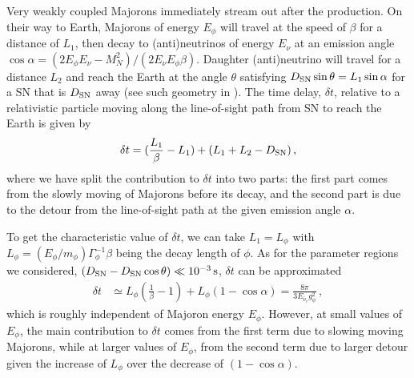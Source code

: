 Very weakly coupled Majorons immediately stream out after the production. On their way to Earth, Majorons of energy $E_\phi$ will travel at the speed of $\beta$ for a distance of $L_1$, then decay to (anti)neutrinos of energy $E_\nu$ at an emission angle $\cos\alpha = (2 E_\phi E_{\nu} - M^2_N)/(2E_{\nu}E_\phi\beta)$. Daughter (anti)neutrino will travel for a distance $L_2$ and reach the Earth at the angle $\theta$ satisfying $D_{\rm SN} \sin\theta = L_1 \sin\alpha$ for a SN that is $D_{\rm SN}$ away (see such geometry in \cite{Brdar:2023tmi}). The time delay, $\delta t$, relative to a relativistic particle moving along the line-of-sight path from SN to reach the Earth is given by
\cite{Jaeckel:2017tud}
\begin{align}
    \delta t = (\frac{L_1}{\beta}-L_1) + (L_1 + L_2 -D_{\rm SN})\,,
    \label{eq:deltatexa}
\end{align}
where we have split the contribution to $\delta t$ into two parts: the first part comes from the slowly moving of Majorons before its decay, and the second part is due to the detour from the line-of-sight path at the given emission angle $\alpha$. 

To get the characteristic value of $\delta t$, we can take $L_1 = L_\phi$ with $L_\phi = (E_\phi/m_\phi) \Gamma^{-1}_\phi \beta$ being the decay length of $\phi$. As for the parameter regions we considered, $(D_{\rm SN} -D_{\rm SN} \cos\theta) \ll \unit[10^{-3}]{s}$, $\delta t$ can be approximated
\begin{align}
    \delta t &\simeq L_\phi(\frac{1}{\beta} -1) + L_\phi(1-\cos\alpha) = \frac{8\pi}{3 E_{\bar{\nu}_{e}}g_\phi^2}\,,
    \label{eq:deltat}
\end{align}
which is roughly independent of Majoron energy $E_\phi$. However, at small values of $E_\phi$, the main contribution to $\delta t$ comes from the first term due to slowing moving Majorons, while at larger values of $E_\phi$, from the second term due to larger detour given the increase of $L_\phi$ over the decrease of $(1-\cos\alpha)$.


